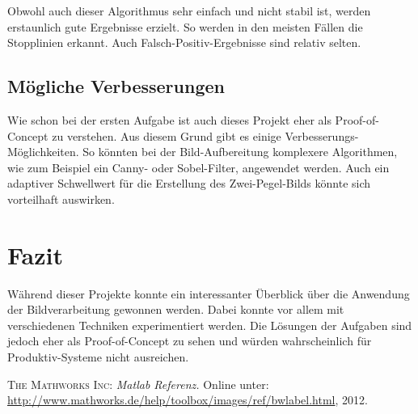 \documentclass[a4paper,DIV=calc,ngerman]{scrartcl}
\begin{document}
Obwohl auch dieser Algorithmus sehr einfach und nicht stabil ist, werden erstaunlich gute Ergebnisse erzielt. So werden in den meisten Fällen die Stopplinien erkannt. Auch Falsch-Positiv-Ergebnisse sind relativ selten.


\subsection{Mögliche Verbesserungen}
\label{sec:a2verbesserungen}
Wie schon bei der ersten Aufgabe ist auch dieses Projekt eher als Proof-of-Concept zu verstehen. Aus diesem Grund gibt es einige Verbesserungs-Möglichkeiten. So könnten bei der Bild-Aufbereitung komplexere Algorithmen, wie zum Beispiel ein Canny- oder Sobel-Filter, angewendet werden. Auch ein adaptiver Schwellwert für die Erstellung des Zwei-Pegel-Bilds könnte sich vorteilhaft auswirken.


\section{Fazit}
\label{sec:Fazit}
Während dieser Projekte konnte ein interessanter Überblick über die Anwendung der Bildverarbeitung gewonnen werden. Dabei konnte vor allem mit verschiedenen Techniken experimentiert werden. Die Lösungen der Aufgaben sind jedoch eher als Proof-of-Concept zu sehen und würden wahrscheinlich für Produktiv-Systeme nicht ausreichen.




\begin{thebibliography}{------}
\label{sec:Literatur}

 \textsc{The Mathworks Inc}: {\em Matlab Referenz.} Online unter: \url{http://www.mathworks.de/help/toolbox/images/ref/bwlabel.html}, 2012.





\end{thebibliography}
\end{document}
